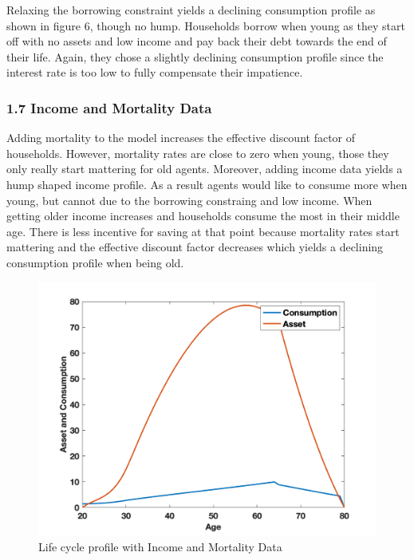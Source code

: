 \documentclass[letterpaper,12pt]{article}
\begin{document}
Relaxing the borrowing constraint yields a declining consumption profile as shown in figure 6, though no hump. Households borrow when young as they start off with no assets and low income and pay back their debt towards the end of their life. Again, they chose a slightly declining consumption profile since the interest rate is too low to fully compensate their impatience.






\subsubsection*{1.7 Income and Mortality Data}
Adding mortality to the model increases the effective discount factor of households. However, mortality rates are close to zero when young, those they only really start mattering for old agents. Moreover, adding income data yields a hump shaped income profile. As a result agents would like to consume more when young, but cannot due to the borrowing constraing and low income. When getting older income increases and households consume the most in their middle age. There is less incentive for saving at that point because mortality rates start mattering and the effective discount factor decreases which yields a declining consumption profile when being old. 

\begin{figure}
\includegraphics[scale=0.45]{Figures/Part1_PE/sim_Data}
\caption{Life cycle profile with Income and Mortality Data}
\end{figure}
\newpage
\end{document}
